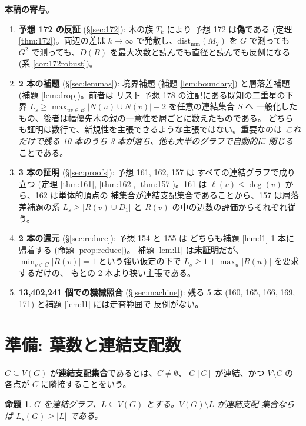 \documentclass[paper=a4,fontsize=10.5pt,jafontsize=10.5pt]{jlreq}
\theoremstyle{plain}
\newtheorem{proposition}[theorem]{命題}
\theoremstyle{definition}
\begin{document}
\medskip
\noindent\textbf{本稿の寄与}。

\begin{enumerate}
\item \textbf{予想 172 の反証} (\S\ref{sec:172}): 木の族 $T_k$ により
  予想 172 は\textbf{偽}である (定理 \ref{thm:172})。両辺の差は
  $k \to \infty$ で発散し、$\mathrm{dist}_{\min}(M_2)$ を $G$ で測っても
  $G^2$ で測っても、$D(B)$ を最大次数と読んでも直径と読んでも反例になる
  (系 \ref{cor:172robust})。
\item \textbf{2 本の補題} (\S\ref{sec:lemmas}): 境界補題 (補題
  \ref{lem:boundary}) と層落差補題 (補題 \ref{lem:drop})。前者は
  リスト \cite{wowii} 予想 178 の注記にある既知の二重星の下界
  $L_s \ge \max_{uv \in E}|N(u) \cup N(v)| - 2$ を任意の連結集合 $S$ へ
  一般化したもの、後者は幅優先木の親の一意性を層ごとに数えたものである。
  どちらも証明は数行で、新規性を主張できるような主張ではない。重要なのは
  \emph{これだけで残る 10 本のうち 3 本が落ち、他も大半のグラフで自動的に
  閉じる}ことである。
\item \textbf{3 本の証明} (\S\ref{sec:proofs}): 予想 161, 162, 157 は
  すべての連結グラフで成り立つ (定理 \ref{thm:161}, \ref{thm:162},
  \ref{thm:157})。161 は $\ell(v) \le \deg(v)$ から、162 は単体的頂点の
  補集合が連結支配集合であることから、157 は層落差補題の系
  $L_s \ge |R(v) \cup D_1|$ と $R(v)$ の中の辺数の評価からそれぞれ従う。
\item \textbf{2 本の還元} (\S\ref{sec:reduce}): 予想 154 と 155 は
  どちらも補題 \ref{lem:l1} 1 本に帰着する (命題 \ref{prop:reduce})。
  補題 \ref{lem:l1} は\textbf{未証明}だが、$\min_{v \in C} |R(v)| = 1$
  という強い仮定の下で $L_s \ge 1 + \max_u |R(u)|$ を要求するだけの、
  もとの 2 本より狭い主張である。
\item \textbf{13,402,241 個での機械照合} (\S\ref{sec:machine}):
  残る 5 本 (160, 165, 166, 169, 171) と補題 \ref{lem:l1} には走査範囲で
  反例がない。
\end{enumerate}

\section{準備: 葉数と連結支配数}\label{sec:prelim}

$C \subseteq V(G)$ が\textbf{連結支配集合}であるとは、$C \ne \emptyset$、
$G[C]$ が連結、かつ $V \setminus C$ の各点が $C$ に隣接することをいう。

\begin{proposition}\label{prop:cds}
$G$ を連結グラフ、$L \subseteq V(G)$ とする。$V(G) \setminus L$ が連結支配
集合ならば $L_s(G) \ge |L|$ である。
\end{proposition}
\end{document}
